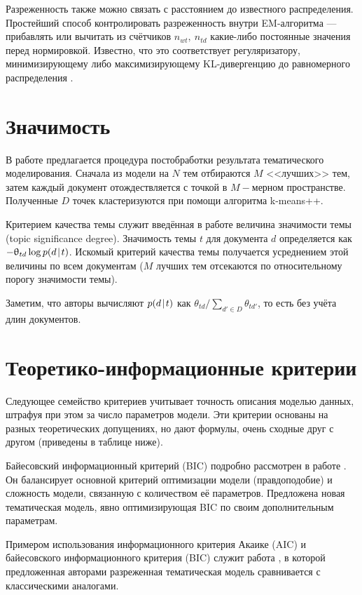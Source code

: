 Разреженность также можно связать с расстоянием до известного распределения. Простейший способ контролировать разреженность внутри EM-алгоритма  --- прибавлять или вычитать из счётчиков $n_{wt},~n_{td}$ какие-либо постоянные значения перед нормировкой. Известно, что это соответствует регуляризатору, минимизирующему либо максимизирующему KL-дивергенцию до равномерного распределения \cite{voron15mlj}.

\section{Значимость}

В работе \cite{ma2014three} предлагается процедура постобработки результата тематического моделирования. Сначала из модели на $N$ тем отбираются $M$ <<лучших>> тем, затем каждый документ отождествляется с точкой в $M-$мерном пространстве. Полученные $D$ точек кластеризуются при помощи алгоритма k-means++.

Критерием качества темы служит введённая в работе величина значимости темы (topic significance degree). Значимость темы $t$ для документа $d$ определяется как $-\uptheta_{td}\log p(d\mspace{2mu}{|}\mspace{2mu} t)$. Искомый критерий качества темы получается усреднением этой величины по всем документам ($M$ лучших тем отсекаются по относительному порогу значимости темы).

Заметим, что авторы вычисляют $p(d\mspace{2mu}{|}\mspace{2mu} t)$ как
$\theta_{td} / \sum_{d' \in D} \theta_{td'}$,
то есть без учёта длин документов.

\section{Теоретико-информационные критерии}

Следующее семейство критериев учитывает точность описания моделью данных, штрафуя при этом за число параметров модели. Эти критерии основаны на разных теоретических допущениях, но дают формулы, очень сходные друг с другом (приведены в таблице ниже).

Байесовский информационный критерий (BIC) подробно рассмотрен в работе \cite{soleimani14parsimonious}. Он балансирует основной критерий оптимизации модели (правдоподобие) и сложность модели, связанную с количеством её параметров. Предложена новая тематическая модель, явно оптимизирующая BIC по своим дополнительным параметрам.

Примером использования информационного критерия Акаике (AIC) и байесовского информационного критерия (BIC) служит работа \cite{than2012fully}, в которой предложенная авторами разреженная тематическая модель сравнивается с классическими аналогами.

